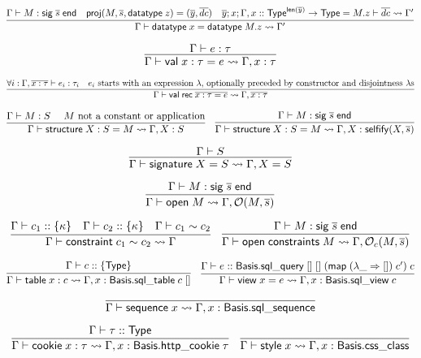 \documentclass{article}
\newcommand{\mt}[1]{\mathsf{#1}}
\begin{document}
$$\infer{\Gamma \vdash \mt{datatype} \; x = \mt{datatype} \; M.z \leadsto \Gamma'}{
  \Gamma \vdash M : \mt{sig} \; \overline{s} \; \mt{end}
  & \mt{proj}(M, \overline{s}, \mt{datatype} \; z) = (\overline{y}, \overline{dc})
  & \overline{y}; x; \Gamma, x :: \mt{Type}^{\mt{len}(\overline y)} \to \mt{Type} = M.z \vdash \overline{dc} \leadsto \Gamma'
}$$

$$\infer{\Gamma \vdash \mt{val} \; x : \tau = e \leadsto \Gamma, x : \tau}{
  \Gamma \vdash e : \tau
}$$

$$\infer{\Gamma \vdash \mt{val} \; \mt{rec} \; \overline{x : \tau = e} \leadsto \Gamma, \overline{x : \tau}}{
  \forall i: \Gamma, \overline{x : \tau} \vdash e_i : \tau_i
  & \textrm{$e_i$ starts with an expression $\lambda$, optionally preceded by constructor and disjointness $\lambda$s}
}$$

$$\infer{\Gamma \vdash \mt{structure} \; X : S = M \leadsto \Gamma, X : S}{
  \Gamma \vdash M : S
  & \textrm{ $M$ not a constant or application}
}
\quad \infer{\Gamma \vdash \mt{structure} \; X : S = M \leadsto \Gamma, X : \mt{selfify}(X, \overline{s})}{
  \Gamma \vdash M : \mt{sig} \; \overline{s} \; \mt{end}
}$$

$$\infer{\Gamma \vdash \mt{signature} \; X = S \leadsto \Gamma, X = S}{
  \Gamma \vdash S
}$$

$$\infer{\Gamma \vdash \mt{open} \; M \leadsto \Gamma, \mathcal O(M, \overline{s})}{
  \Gamma \vdash M : \mt{sig} \; \overline{s} \; \mt{end}
}$$

$$\infer{\Gamma \vdash \mt{constraint} \; c_1 \sim c_2 \leadsto \Gamma}{
  \Gamma \vdash c_1 :: \{\kappa\}
  & \Gamma \vdash c_2 :: \{\kappa\}
  & \Gamma \vdash c_1 \sim c_2
}
\quad \infer{\Gamma \vdash \mt{open} \; \mt{constraints} \; M \leadsto \Gamma, \mathcal O_c(M, \overline{s})}{
  \Gamma \vdash M : \mt{sig} \; \overline{s} \; \mt{end}
}$$

$$\infer{\Gamma \vdash \mt{table} \; x : c \leadsto \Gamma, x : \mt{Basis}.\mt{sql\_table} \; c \; []}{
  \Gamma \vdash c :: \{\mt{Type}\}
}
\quad \infer{\Gamma \vdash \mt{view} \; x = e \leadsto \Gamma, x : \mt{Basis}.\mt{sql\_view} \; c}{
  \Gamma \vdash e :: \mt{Basis}.\mt{sql\_query} \; [] \; [] \; (\mt{map} \; (\lambda \_ \Rightarrow []) \; c') \; c
}$$

$$\infer{\Gamma \vdash \mt{sequence} \; x \leadsto \Gamma, x : \mt{Basis}.\mt{sql\_sequence}}{}$$

$$\infer{\Gamma \vdash \mt{cookie} \; x : \tau \leadsto \Gamma, x : \mt{Basis}.\mt{http\_cookie} \; \tau}{
  \Gamma \vdash \tau :: \mt{Type}
}
\quad \infer{\Gamma \vdash \mt{style} \; x \leadsto \Gamma, x : \mt{Basis}.\mt{css\_class}}{}$$
\end{document}
